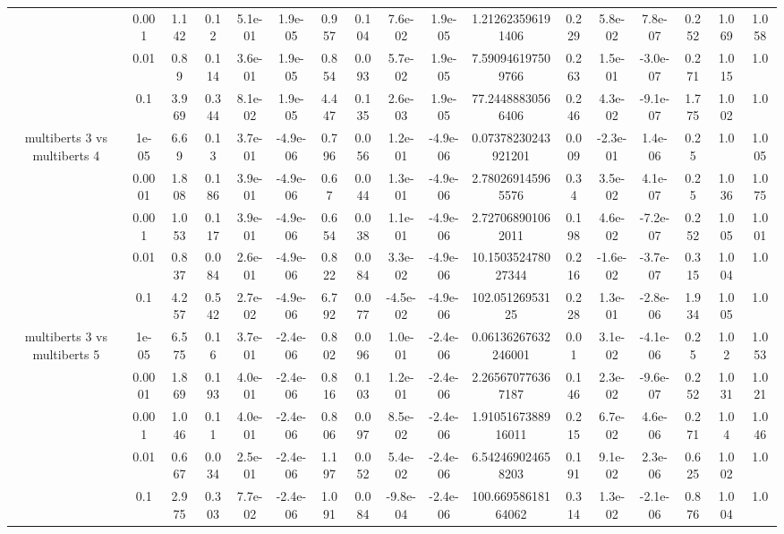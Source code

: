 \begin{tabular}{|c|c|c|c|c|c|c|c|c|c|c|c|c|c|c|c|c|}
 & 0.001 & 1.142 & 0.12 & 5.1e-01 & 1.9e-05 & 0.957 & 0.104 & 7.6e-02 & 1.9e-05 & 1.212623596191406 & 0.229 & 5.8e-02 & 7.8e-07 & 0.252 & 1.069 & 1.058 \\
 & 0.01 & 0.89 & 0.114 & 3.6e-01 & 1.9e-05 & 0.854 & 0.093 & 5.7e-02 & 1.9e-05 & 7.590946197509766 & 0.263 & 1.5e-01 & -3.0e-07 & 0.271 & 1.015 & 1.0 \\
 & 0.1 & 3.969 & 0.344 & 8.1e-02 & 1.9e-05 & 4.447 & 0.135 & 2.6e-03 & 1.9e-05 & 77.24488830566406 & 0.246 & 4.3e-02 & -9.1e-07 & 1.775 & 1.002 & 1.0 \\
\hline
\multirow{5}{*}{multiberts 3 vs multiberts 4} & 1e-05 & 6.69 & 0.13 & 3.7e-01 & -4.9e-06 & 0.796 & 0.056 & 1.2e-01 & -4.9e-06 & 0.07378230243921201 & 0.009 & -2.3e-01 & 1.4e-06 & 0.25 & 1.0 & 1.005 \\
 & 0.0001 & 1.808 & 0.186 & 3.9e-01 & -4.9e-06 & 0.67 & 0.044 & 1.3e-01 & -4.9e-06 & 2.780269145965576 & 0.34 & 3.5e-02 & 4.1e-07 & 0.25 & 1.036 & 1.075 \\
 & 0.001 & 1.053 & 0.117 & 3.9e-01 & -4.9e-06 & 0.654 & 0.038 & 1.1e-01 & -4.9e-06 & 2.727068901062011 & 0.198 & 4.6e-02 & -7.2e-07 & 0.252 & 1.005 & 1.001 \\
 & 0.01 & 0.837 & 0.084 & 2.6e-01 & -4.9e-06 & 0.822 & 0.084 & 3.3e-02 & -4.9e-06 & 10.150352478027344 & 0.216 & -1.6e-02 & -3.7e-07 & 0.315 & 1.004 & 1.0 \\
 & 0.1 & 4.257 & 0.542 & 2.7e-02 & -4.9e-06 & 6.792 & 0.077 & -4.5e-02 & -4.9e-06 & 102.05126953125 & 0.228 & 1.3e-01 & -2.8e-06 & 1.934 & 1.005 & 1.0 \\
\hline
\multirow{5}{*}{multiberts 3 vs multiberts 5} & 1e-05 & 6.575 & 0.16 & 3.7e-01 & -2.4e-06 & 0.802 & 0.096 & 1.0e-01 & -2.4e-06 & 0.06136267632246001 & 0.01 & 3.1e-02 & -4.1e-06 & 0.25 & 1.02 & 1.053 \\
 & 0.0001 & 1.869 & 0.193 & 4.0e-01 & -2.4e-06 & 0.816 & 0.103 & 1.2e-01 & -2.4e-06 & 2.265670776367187 & 0.146 & 2.3e-02 & -9.6e-07 & 0.252 & 1.031 & 1.021 \\
 & 0.001 & 1.046 & 0.11 & 4.0e-01 & -2.4e-06 & 0.806 & 0.097 & 8.5e-02 & -2.4e-06 & 1.9105167388916011 & 0.215 & 6.7e-02 & 4.6e-06 & 0.271 & 1.04 & 1.046 \\
 & 0.01 & 0.667 & 0.034 & 2.5e-01 & -2.4e-06 & 1.197 & 0.052 & 5.4e-02 & -2.4e-06 & 6.542469024658203 & 0.191 & 9.1e-02 & 2.3e-06 & 0.625 & 1.002 & 1.0 \\
 & 0.1 & 2.975 & 0.303 & 7.7e-02 & -2.4e-06 & 1.091 & 0.084 & -9.8e-04 & -2.4e-06 & 100.66958618164062 & 0.314 & 1.3e-02 & -2.1e-06 & 0.876 & 1.004 & 1.0 \\

\end{tabular}
